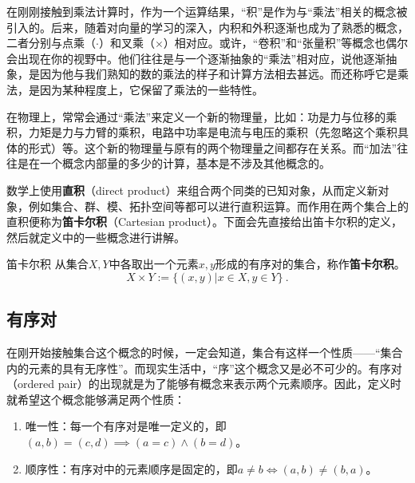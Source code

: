 
\begin{issues}
\issueDraft
\end{issues}

在刚刚接触到乘法计算时，作为一个运算结果，“积”是作为与“乘法”相关的概念被引入的。后来，随着对向量的学习的深入，内积和外积逐渐也成为了熟悉的概念，二者分别与点乘（$\cdot$）和叉乘（$\times$）相对应。或许，“卷积”和“张量积”等概念也偶尔会出现在你的视野中。他们往往是与一个逐渐抽象的“乘法”相对应，说他逐渐抽象，是因为他与我们熟知的数的乘法的样子和计算方法相去甚远。而还称呼它是乘法，是因为某种程度上，它保留了乘法的一些特性。

在物理上，常常会通过“乘法”来定义一个新的物理量，比如：功是力与位移的乘积，力矩是力与力臂的乘积，电路中功率是电流与电压的乘积（先忽略这个乘积具体的形式）等。这个新的物理量与原有的两个物理量之间都存在关系。而“加法”往往是在一个概念内部量的多少的计算，基本是不涉及其他概念的。

数学上使用\textbf{直积}（direct product）来组合两个同类的已知对象，从而定义新对象，例如集合、群、模、拓扑空间等都可以进行直积运算。而作用在两个集合上的直积便称为\textbf{笛卡尔积}（Cartesian product）。下面会先直接给出笛卡尔积的定义，然后就定义中的一些概念进行讲解。

\begin{definition}{笛卡尔积}\label{def_CartPr_1}
从集合$X,Y$中各取出一个元素$x,y$形成的有序对的集合，称作\textbf{笛卡尔积}。
\begin{equation}
X\times Y:=\{(x,y)|x\in X,y\in Y\}~.
\end{equation}

\end{definition}

\subsection{有序对}

在刚开始接触集合这个概念的时候，一定会知道，集合有这样一个性质——“集合内的元素的具有无序性”。而现实生活中，“序”这个概念又是必不可少的。有序对（ordered pair）的出现就是为了能够有概念来表示两个元素顺序。因此，定义时就希望这个概念能够满足两个性质：

\begin{enumerate}
\item 唯一性：每一个有序对是唯一定义的，即$(a, b) = (c, d)\implies (a = c) \land (b = d)$。
\item 顺序性：有序对中的元素顺序是固定的，即$a\neq b\iff(a, b)\neq (b, a)$。
\end{enumerate}

